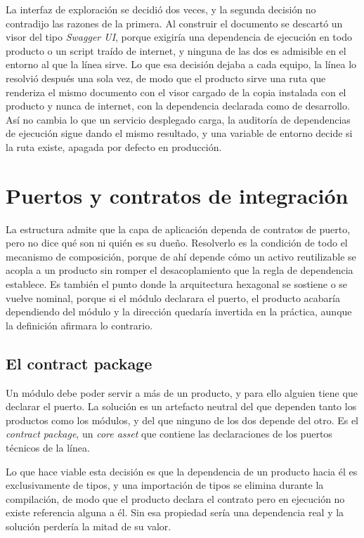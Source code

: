 La interfaz de exploración se decidió dos veces, y la segunda decisión no
contradijo las razones de la primera. Al construir el documento se descartó un
visor del tipo \emph{Swagger UI}, porque exigiría una dependencia de ejecución
en todo producto o un script traído de internet, y ninguna de las dos es
admisible en el entorno al que la línea sirve. Lo que esa decisión dejaba a
cada equipo, la línea lo resolvió después una sola vez, de modo que el
producto sirve una ruta que renderiza el mismo documento con el visor cargado
de la copia instalada con el producto y nunca de internet, con la dependencia
declarada como de desarrollo. Así no cambia lo que un servicio desplegado
carga, la auditoría de dependencias de ejecución sigue dando el mismo
resultado, y una variable de entorno decide si la ruta existe, apagada por
defecto en producción.

\section{Puertos y contratos de integración}
\label{sec:puertos-contratos}

La estructura admite que la capa de aplicación dependa de contratos de
puerto, pero no dice qué son ni quién es su dueño. Resolverlo es la condición
de todo el mecanismo de composición, porque de ahí depende cómo un activo
reutilizable se acopla a un producto sin romper el desacoplamiento que la
regla de dependencia establece. Es también el punto donde la arquitectura
hexagonal se sostiene o se vuelve nominal, porque si el módulo declarara el
puerto, el producto acabaría dependiendo del módulo y la dirección quedaría
invertida en la práctica, aunque la definición afirmara lo contrario.

\subsection{El contract package}

Un módulo debe poder servir a más de un producto, y para ello alguien tiene
que declarar el puerto. La solución es un artefacto neutral del que dependen
tanto los productos como los módulos, y del que ninguno de los dos depende
del otro. Es el \emph{contract package}, un \emph{core asset} que contiene
las declaraciones de los puertos técnicos de la línea.

Lo que hace viable esta decisión es que la dependencia de un producto hacia él
es exclusivamente de tipos, y una importación de tipos se elimina durante la
compilación, de modo que el producto declara el contrato pero en ejecución no
existe referencia alguna a él. Sin esa propiedad sería una dependencia real y
la solución perdería la mitad de su valor.

